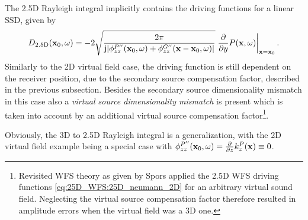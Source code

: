 The 2.5D Rayleigh integral implicitly contains the driving functions for a linear SSD, given by
\begin{equation}
D_{2.5\mathrm{D}}(\mathbf{x}_0,\omega) = -2
\sqrt{\frac{2\pi}{\mathrm{j} |\phi_{zz}^{P''}(\mathbf{x}_0, \omega) + \phi_{zz}^{G''}(\mathbf{x} - \mathbf{x}_0,\omega)|}}
\left. \frac{\partial}{\partial y} P(\mathbf{x},\omega) \right|_{\mathbf{x} = \mathbf{x}_0}.
\label{eq:25D_WFS:25D_driv_fun_general} 
\end{equation}
Similarly to the 2D virtual field case, the driving function is still dependent on the receiver position, due to the secondary source compensation factor, described in the previous subsection.
Besides the secondary source dimensionality mismatch in this case also a \emph{virtual source dimensionality mismatch} is present which is taken into account by an additional virtual source compensation factor\footnote{Revisited WFS theory as given by Spors applied the 2.5D WFS driving functions \eqref{eq:25D_WFS:25D_neumann_2D} for an arbitrary virtual sound field. Neglecting the virtual source compensation factor therefore resulted in amplitude errors when the virtual field was a 3D one.}.

Obviously, the 3D to 2.5D Rayleigh integral is a generalization, with the 2D virtual field example being a special case with $\phi_{zz}^{P''}(\mathbf{x}_0, \omega) = \frac{\partial}{\partial z} k_{z}^P(\mathbf{x}) \equiv 0$.

